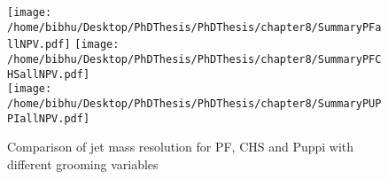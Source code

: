\begin{figure}[h!]
\centering
\texttt{[image: /home/bibhu/Desktop/PhDThesis/PhDThesis/chapter8/SummaryPFallNPV.pdf]}
\texttt{[image: /home/bibhu/Desktop/PhDThesis/PhDThesis/chapter8/SummaryPFCHSallNPV.pdf]}\\
\texttt{[image: /home/bibhu/Desktop/PhDThesis/PhDThesis/chapter8/SummaryPUPPIallNPV.pdf]}
\caption{Comparison of jet mass resolution for PF, CHS and Puppi  with different grooming variables}
\label{fig:summary_all_groomer_QCD}
\end{figure}
















